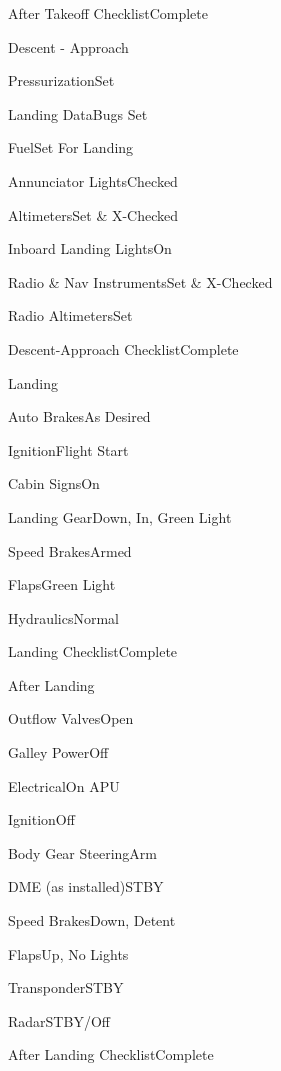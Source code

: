 \documentclass[sim-use, blue_items, halfpage]{checklist}
\begin{document}
\begin{continuedchecklist}
	\item{After Takeoff Checklist}{Complete}
\end{continuedchecklist}

\begin{checklist}{Descent - Approach}
	\item{Pressurization}{Set}
	\item{Landing Data}{Bugs Set}
	\item{Fuel}{Set For Landing}
	\item{Annunciator Lights}{Checked}
	\item{Altimeters}{Set \& X-Checked}
	\item{Inboard Landing Lights}{On}
	\item{Radio \& Nav Instruments}{Set \& X-Checked}
	\item{Radio Altimeters}{Set}
	\item{Descent-Approach Checklist}{Complete}
\end{checklist}

\begin{checklist}{Landing}
	\item{Auto Brakes}{As Desired}
	\item{Ignition}{Flight Start}
	\item{Cabin Signs}{On}
	\item{Landing Gear}{Down, In, Green Light}
	\item{Speed Brakes}{Armed}
	\item{Flaps}{\blank \blank Green Light}
	\item{Hydraulics}{Normal}
	\item{Landing Checklist}{Complete}
\end{checklist}

\begin{checklist}{After Landing}
	\item{Outflow Valves}{Open}
	\item{Galley Power}{Off}
	\item{Electrical}{On APU}
	\item{Ignition}{Off}
	\item{Body Gear Steering}{Arm}
	\item{DME (as installed)}{STBY}
	\item{Speed Brakes}{Down, Detent}
	\item{Flaps}{Up, No Lights}
\end{checklist}

\begin{continuedchecklist}
	\item{Transponder}{STBY}
	\item{Radar}{STBY/Off}
	\item{After Landing Checklist}{Complete}
\end{continuedchecklist}
\end{document}

